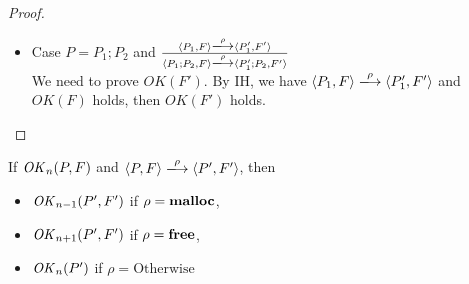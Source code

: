 \begin{proof}
\begin{itemize}
    \item Case \( P = P_1;P_2\) and \( \frac{ \langle P_1, F \rangle \xlongrightarrow{\rho} \langle P_1', F' \rangle }
      {\langle P_1;P_2, F \rangle \xlongrightarrow{\rho} \langle P_1';P_2, F' \rangle} \) \\
    We need to prove \(OK(F')\). By IH, we have \( \langle P_1, F
    \rangle \xlongrightarrow{\rho} \langle P_1', F' \rangle \) and \(
    OK(F) \) holds, then \(OK(F')\) holds.
      
      
  \end{itemize}
\end{proof}



\begin{lemma}
\label{lem:okPreserved}
If \(\mathit{OK}_n(P, F)\) and \( \langle P, F \rangle \xlongrightarrow{\rho} \langle P', F' \rangle\), then
\begin{itemize}
\item \(\mathit{OK}_{n-1}(P', F')\) if \(\rho = \mathbf{malloc}\),
\item \(\mathit{OK}_{n+1}(P', F')\) if \(\rho = \mathbf{free}\),
\item \(\mathit{OK}_n(P')\) if \(\rho = \mbox{Otherwise}  \)
\end{itemize}
\end{lemma}

